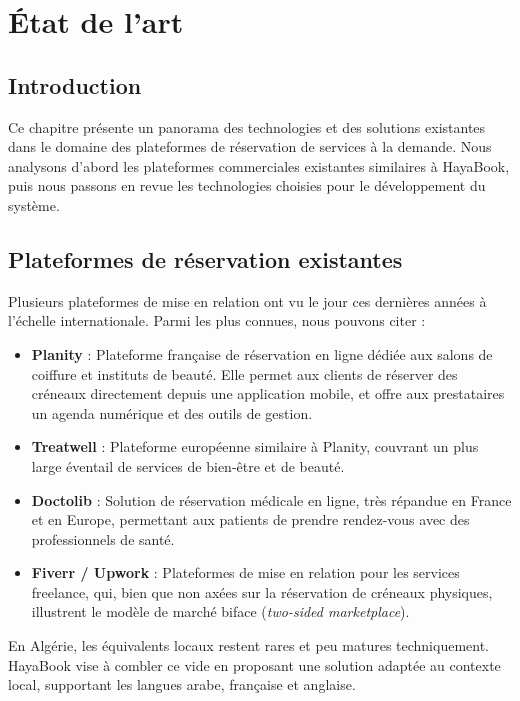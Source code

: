 \chapter{État de l'art}

\section{Introduction}

Ce chapitre présente un panorama des technologies et des solutions existantes dans le domaine des plateformes de réservation de services à la demande. Nous analysons d'abord les plateformes commerciales existantes similaires à HayaBook, puis nous passons en revue les technologies choisies pour le développement du système.

\section{Plateformes de réservation existantes}

Plusieurs plateformes de mise en relation ont vu le jour ces dernières années à l'échelle internationale. Parmi les plus connues, nous pouvons citer :

\begin{itemize}
    \item \textbf{Planity} : Plateforme française de réservation en ligne dédiée aux salons de coiffure et instituts de beauté. Elle permet aux clients de réserver des créneaux directement depuis une application mobile, et offre aux prestataires un agenda numérique et des outils de gestion.
    \item \textbf{Treatwell} : Plateforme européenne similaire à Planity, couvrant un plus large éventail de services de bien-être et de beauté.
    \item \textbf{Doctolib} : Solution de réservation médicale en ligne, très répandue en France et en Europe, permettant aux patients de prendre rendez-vous avec des professionnels de santé.
    \item \textbf{Fiverr / Upwork} : Plateformes de mise en relation pour les services freelance, qui, bien que non axées sur la réservation de créneaux physiques, illustrent le modèle de marché biface (\textit{two-sided marketplace}).
\end{itemize}

En Algérie, les équivalents locaux restent rares et peu matures techniquement. HayaBook vise à combler ce vide en proposant une solution adaptée au contexte local, supportant les langues arabe, française et anglaise.

